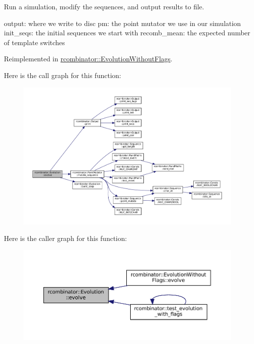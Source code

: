 Run a simulation, modify the sequences, and output results to file. 

output\+: where we write to disc pm\+: the point mutator we use in our simulation init\+\_\+seqs\+: the initial sequences we start with recomb\+\_\+mean\+: the expected number of template switches 

Reimplemented in \mbox{\hyperlink{classrcombinator_1_1EvolutionWithoutFlags_a9e27b532826998a88d2c157daf53c447}{rcombinator\+::\+Evolution\+Without\+Flags}}.

Here is the call graph for this function\+:
\nopagebreak
\begin{figure}[H]
\begin{center}
\leavevmode
\includegraphics[width=350pt]{classrcombinator_1_1Evolution_a0b8a181242ea8ee3072258fa7ed416f4_cgraph}
\end{center}
\end{figure}
Here is the caller graph for this function\+:
\nopagebreak
\begin{figure}[H]
\begin{center}
\leavevmode
\includegraphics[width=350pt]{classrcombinator_1_1Evolution_a0b8a181242ea8ee3072258fa7ed416f4_icgraph}
\end{center}
\end{figure}


